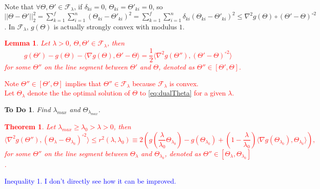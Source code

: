 \documentclass{article}
\newtheorem{theorem}{Theorem}
\newtheorem{lemma}{Lemma}
\newtheorem{todo}{To Do}
\providecommand{\note}[1]{\textcolor{red}{#1}}
\providecommand{\comment}[1]{\textcolor{blue}{#1}}
\begin{document}
Note that $\forall\Theta,\Theta'\in\mathcal{F}_\lambda$, if $\delta_{ki}=0$, $\Theta_{ki}=\Theta'_{ki}=0$, so $||\Theta-\Theta'||_2^2=\sum_{k=1}^f\sum_{i=1}^n(\Theta_{ki}-\Theta'_{ki})^2=\sum_{k=1}^f\sum_{i=1}^n\delta_{ki}(\Theta_{ki}-\Theta'_{ki})^2\leq \nabla^2 g(\Theta)\circ(\Theta'-\Theta)^{\circ 2}$. In $\mathcal{F}_\lambda$, $g(\Theta)$ is actually strongly convex with modulus $1$.


\note{
\begin{lemma}
    \label{lem:1}
    Let $\lambda>0$, $\Theta,\Theta'\in\mathcal{F}_\lambda$, then
    \begin{equation}
        \label{eq:expand}
        g(\Theta')-g(\Theta)-\langle\nabla g(\Theta),\Theta'-\Theta\rangle=\frac{1}{2}\langle\nabla^2 g(\Theta''),(\Theta'-\Theta)^{\circ 2}\rangle%
    \end{equation}
    for some $\Theta''$ on the line segment between $\Theta'$ and $\Theta$, denoted as $\Theta''\in[\Theta',\Theta]$.
\end{lemma}
Note $\Theta''\in[\Theta',\Theta]$ implies that $\Theta''\in\mathcal{F}_\lambda$ because $\mathcal{F}_\lambda$ is convex.\\
Let $\Theta_\lambda$ denote the the optimal solution of $\Theta$ to \eqref{eq:dualTheta} for a given $\lambda$.
}


\begin{todo}
    Find $\lambda_{max}$ and $\Theta_{\lambda_{max}}$.
\end{todo}

\note{
\begin{theorem}
    \label{thm:1}
    Let $\lambda_{max}\geq\lambda_0>\lambda>0$, then
    \begin{equation}
        \langle\nabla^2 g(\Theta''),(\Theta_\lambda-\Theta_{\lambda_0})^{\circ 2}\rangle\leq r^2(\lambda,\lambda_0)\equiv 2\left(g\left(\frac{\lambda}{\lambda_0}\Theta_{\lambda_0}\right)-g(\Theta_{\lambda_0})+\left(1-\frac{\lambda}{\lambda_0}\right)\langle\nabla g(\Theta_{\lambda_0}),\Theta_{\lambda_0}\rangle\right),
    \end{equation}
    for some $\Theta''$ on the line segment between $\Theta_\lambda$ and $\Theta_{\lambda_0}$, denoted as $\Theta''\in[\Theta_\lambda,\Theta_{\lambda_0}]$.
\end{theorem}
}
\comment{Inequality 1. I don't directly see how it can be improved.}
\end{document}
